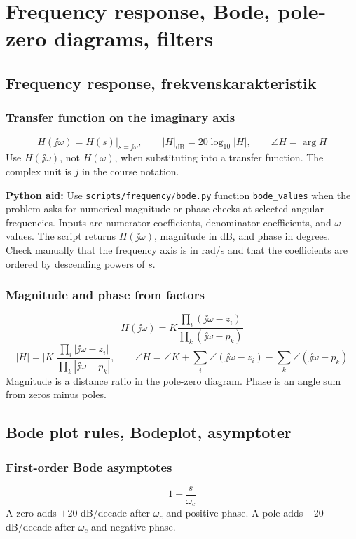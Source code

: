 \section{Frequency response, Bode, pole-zero diagrams, filters}

\subsection{Frequency response, frekvenskarakteristik}

\subsubsection{Transfer function on the imaginary axis}
\[
H(\jj\omega)=H(s)\big|_{s=\jj\omega},\qquad
|H|_{\mathrm{dB}}=20\log_{10}|H|,\qquad
\angle H=\arg H
\]
Use \(H(\jj\omega)\), not \(H(\omega)\), when substituting into a transfer function. The complex unit is \(j\) in the course notation.

\textbf{Python aid:} Use \texttt{scripts/frequency/bode.py} function \texttt{bode\_values} when the problem asks for numerical magnitude or phase checks at selected angular frequencies. Inputs are numerator coefficients, denominator coefficients, and \(\omega\) values. The script returns \(H(\jj\omega)\), magnitude in dB, and phase in degrees. Check manually that the frequency axis is in rad/s and that the coefficients are ordered by descending powers of \(s\).

\subsubsection{Magnitude and phase from factors}
\[
H(\jj\omega)=K\frac{\prod_i(\jj\omega-z_i)}{\prod_k(\jj\omega-p_k)}
\]
\[
|H|=|K|\frac{\prod_i|\jj\omega-z_i|}{\prod_k|\jj\omega-p_k|},\qquad
\angle H=\angle K+\sum_i\angle(\jj\omega-z_i)-\sum_k\angle(\jj\omega-p_k)
\]
Magnitude is a distance ratio in the pole-zero diagram. Phase is an angle sum from zeros minus poles.

\subsection{Bode plot rules, Bodeplot, asymptoter}

\subsubsection{First-order Bode asymptotes}
\[
1+\frac{s}{\omega_c}
\]
A zero adds \(+20\) dB/decade after \(\omega_c\) and positive phase. A pole adds \(-20\) dB/decade after \(\omega_c\) and negative phase.


